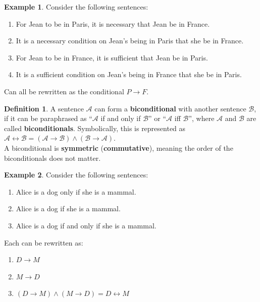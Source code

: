 \documentclass{tufte-handout}
\let\biconditional\leftrightarrow
\theoremstyle{definition}
\newtheorem{defn}{Definition}
\theoremstyle{example}
\newtheorem{exmp}{Example}
\theoremstyle{remark}
\newtheorem{rem}{Remark}
\begin{document}
\begin{exmp}
  Consider the following sentences:
  \begin{enumerate}[leftmargin=3\parindent]
    \item For Jean to be in Paris, it is necessary that Jean be in France.
    \item It is a necessary condition on Jean's being in Paris that she be in France.
    \item For Jean to be in France, it is sufficient that Jean be in Paris.
    \item It is a sufficient condition on Jean's being in France that she be in Paris.
  \end{enumerate}
  Can all be rewritten as the conditional $P \to F$.
\end{exmp}
\begin{framed}
  \begin{defn}
    A sentence $\mathcal{A}$ can form a \textbf{biconditional} with another sentence $\mathcal{B}$, if it can be paraphrased as ``$\mathcal{A}$ if and only if $\mathcal{B}$'' or ``$\mathcal{A}$ iff $\mathcal{B}$'', where $\mathcal{A}$ and $\mathcal{B}$ are called \textbf{biconditionals}. Symbolically, this is represented as $\mathcal{A} \biconditional \mathcal{B} = (\mathcal{A} \to \mathcal{B}) \land (\mathcal{B} \to \mathcal{A})$. \\[1em]
    A biconditional is \textbf{symmetric} (\textbf{commutative}), meaning the order of the biconditionals does not matter.  
  \end{defn}
\end{framed}
\begin{exmp}
  Consider the following sentences:
  \begin{enumerate}[leftmargin=3\parindent]
    \item Alice is a dog only if she is a mammal.
    \item Alice is a dog if she is a mammal.
    \item Alice is a dog if and only if she is a mammal.
  \end{enumerate}
  Each can be rewritten as:
  \begin{enumerate}[leftmargin=3\parindent]
    \item $D \to M$
    \item $M \to D$
    \item $(D \to M) \land (M \to D) = D \biconditional M$
  \end{enumerate}
\end{exmp}
\end{document}

